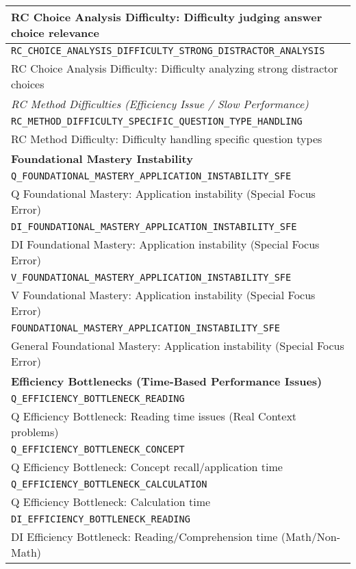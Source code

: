 \documentclass{article}
\begin{document}
{\begin{longtable}{|p{}|}
RC Choice Analysis Difficulty: Difficulty judging answer choice relevance \\
\hline
\texttt{RC\_CHOICE\_ANALYSIS\_DIFFICULTY\_STRONG\_DISTRACTOR\_ANALYSIS} \\
RC Choice Analysis Difficulty: Difficulty analyzing strong distractor choices \\
\hline
\textit{RC Method Difficulties (Efficiency Issue / Slow Performance)} \\
\hline
\texttt{RC\_METHOD\_DIFFICULTY\_SPECIFIC\_QUESTION\_TYPE\_HANDLING} \\
RC Method Difficulty: Difficulty handling specific question types \\
\hline
\textbf{Foundational Mastery Instability} \\
\hline
\texttt{Q\_FOUNDATIONAL\_MASTERY\_APPLICATION\_INSTABILITY\_SFE} \\
Q Foundational Mastery: Application instability (Special Focus Error) \\
\hline
\texttt{DI\_FOUNDATIONAL\_MASTERY\_APPLICATION\_INSTABILITY\_SFE} \\
DI Foundational Mastery: Application instability (Special Focus Error) \\
\hline
\texttt{V\_FOUNDATIONAL\_MASTERY\_APPLICATION\_INSTABILITY\_SFE} \\
V Foundational Mastery: Application instability (Special Focus Error) \\
\hline
\texttt{FOUNDATIONAL\_MASTERY\_APPLICATION\_INSTABILITY\_SFE} \\
General Foundational Mastery: Application instability (Special Focus Error) \\
\hline
\textbf{Efficiency Bottlenecks (Time-Based Performance Issues)} \\
\hline
\texttt{Q\_EFFICIENCY\_BOTTLENECK\_READING} \\
Q Efficiency Bottleneck: Reading time issues (Real Context problems) \\
\hline
\texttt{Q\_EFFICIENCY\_BOTTLENECK\_CONCEPT} \\
Q Efficiency Bottleneck: Concept recall/application time \\
\hline
\texttt{Q\_EFFICIENCY\_BOTTLENECK\_CALCULATION} \\
Q Efficiency Bottleneck: Calculation time \\
\hline
\texttt{DI\_EFFICIENCY\_BOTTLENECK\_READING} \\
DI Efficiency Bottleneck: Reading/Comprehension time (Math/Non-Math) \\

\end{longtable}}
\end{document}
